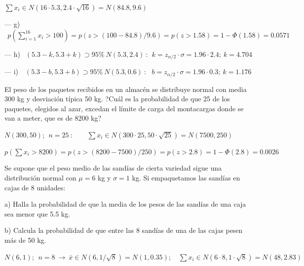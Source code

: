 \vspace{2mm}  $\sum x_i \in N(16\cdot 5.3, 2.4	\cdot \sqrt{16})=N(84.8,9.6)$

\vspace{2mm} --- g) $\ \ p \left( \displaystyle \sum_{i=1}^{16} x_i >100 \right)=p(z>(100-84.8)/9.6)=p(z>1.58)=1-\Phi(1.58)=0.0571$

\vspace{2mm} --- h) $\ \ (5.3-k,5.3+k) \supset 95\% \ N(5.3,2.4) \ : \ \ k=z_{\alpha/2}\cdot \sigma=1.96\cdot 2.4;\ k=4.704$

\vspace{2mm} --- i) $\ \ \  (5.3-b,5.3+b) \supset 95\% \ N(5.3,0.6) \ : \ \ \ b=z_{\alpha/2}\cdot \sigma=1.96\cdot 0.3;\ k=1.176$





\vspace{4mm}
\begin{ejemplo}
\begin{ejer}
	El peso de los paquetes recibidos en un almacén se distribuye normal con media 300 kg y desviación típica 50 kg. ?Cuál es la probabilidad de que 25 de los paquetes, elegidos al azar, excedan el límite de carga del montacargas donde se van a meter, que es de 8200 kg?
\end{ejer}	
\end{ejemplo}

$N(300,50) ;\ \ n=25\ : \qquad \sum x_i \in N(300\cdot 25, 50\cdot \sqrt{25})=N(7500,250)$

\vspace{2mm} $p(\sum x_i>8200)=p(z>(8200-7500)/250)=p(z>2.8)=1-\Phi(2.8)=0.0026$



\vspace{4mm}
\begin{ejemplo}
\begin{ejer}
	Se supone que el peso medio de las sandías de cierta variedad sigue una distribución normal con $\mu = 6$ kg y $\sigma = 1$ kg. Si empaquetamos las sandías en cajas de 8 unidades:

a) Halla la probabilidad de que la media de los pesos de las sandías de una caja sea menor que 5.5 kg.

b) Calcula la probabilidad de que entre las 8 sandías de una de las cajas pesen más de 50 kg.
\end{ejer}	
\end{ejemplo}

$N(6,1);\ \ n=8 \ \to \ \bar x \in N(6,1/\sqrt{8})=N(1,0.35);\quad \sum x_i \in N(6\cdot 8, 1\cdot \sqrt{8})=N(48,2.83)$


